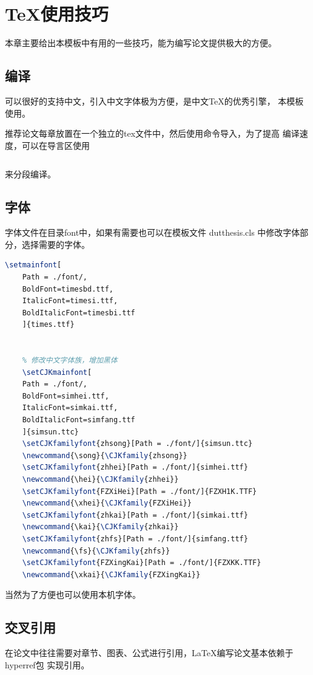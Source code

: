 \chapter{\TeX 使用技巧}
\begin{Sketch}
    本章主要给出本模板中有用的一些技巧，能为编写论文提供极大的方便。
\end{Sketch}
\section{编译}
\label{sec:compile}
    \XeLaTeX 可以很好的支持中文，引入中文字体极为方便，是中文\TeX 的优秀引擎，
    本模板使用\XeLaTeX 。

推荐论文每章放置在一个独立的tex文件中，然后使用\verb||命令导入，为了提高
编译速度，可以在导言区使用 
\begin{lstlisting}

\end{lstlisting}
来分段编译。

\section{字体}
\label{sec:font}
    字体文件在目录font中，如果有需要也可以在模板文件
    dutthesis.cls 中修改字体部分，选择需要的字体。
    \begin{lstlisting}[language=TeX]
	\setmainfont[
	Path = ./font/,
	BoldFont=timesbd.ttf,
	ItalicFont=timesi.ttf,
	BoldItalicFont=timesbi.ttf
	]{times.ttf}


	% 修改中文字体族，增加黑体
	\setCJKmainfont[
	Path = ./font/,
	BoldFont=simhei.ttf,
	ItalicFont=simkai.ttf,
	BoldItalicFont=simfang.ttf
	]{simsun.ttc}
	\setCJKfamilyfont{zhsong}[Path = ./font/]{simsun.ttc}
	\newcommand{\song}{\CJKfamily{zhsong}}
	\setCJKfamilyfont{zhhei}[Path = ./font/]{simhei.ttf}
	\newcommand{\hei}{\CJKfamily{zhhei}}
	\setCJKfamilyfont{FZXiHei}[Path = ./font/]{FZXH1K.TTF}
	\newcommand{\xhei}{\CJKfamily{FZXiHei}}
	\setCJKfamilyfont{zhkai}[Path = ./font/]{simkai.ttf}
	\newcommand{\kai}{\CJKfamily{zhkai}}
	\setCJKfamilyfont{zhfs}[Path = ./font/]{simfang.ttf}
	\newcommand{\fs}{\CJKfamily{zhfs}}
	\setCJKfamilyfont{FZXingKai}[Path = ./font/]{FZXKK.TTF}
	\newcommand{\xkai}{\CJKfamily{FZXingKai}}
    \end{lstlisting}
当然为了方便也可以使用本机字体。



\section{交叉引用}
\label{sec:cross-reference}
在论文中往往需要对章节、图表、公式进行引用，\LaTeX 编写论文基本依赖于hyperref包
实现引用。

